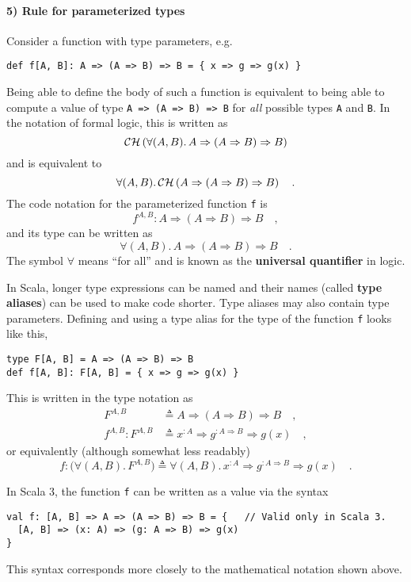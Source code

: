 \paragraph{5) Rule for parameterized types}

Consider a function with type parameters, e.g.
\begin{lstlisting}
def f[A, B]: A => (A => B) => B = { x => g => g(x) }
\end{lstlisting}
Being able to define the body of such a function is equivalent to
being able to compute a value of type \lstinline!A => (A => B) => B!
for \emph{all} possible types \lstinline!A! and \lstinline!B!. In
the notation of formal logic, this is written as
\[
{\cal CH}\left(\forall(A,B).\,A\Rightarrow(A\Rightarrow B)\Rightarrow B\right)
\]
and is equivalent to
\[
\forall(A,B).\,{\cal CH}\left(A\Rightarrow(A\Rightarrow B)\Rightarrow B\right)\quad.
\]
The code notation for the parameterized function \lstinline!f! is
\[
f^{A,B}:A\Rightarrow\left(A\Rightarrow B\right)\Rightarrow B\quad,
\]
and its type can be written as
\[
\forall(A,B).\,A\Rightarrow\left(A\Rightarrow B\right)\Rightarrow B\quad.
\]
The symbol $\forall$ means ``for all'' and is known as the \textbf{universal
quantifier} in logic.

In Scala, longer type expressions can be named and their names (called
\textbf{type aliases}) can be used to make code
shorter. Type aliases may also contain type parameters. Defining and
using a type alias for the type of the function \lstinline!f! looks
like this,
\begin{lstlisting}
type F[A, B] = A => (A => B) => B
def f[A, B]: F[A, B] = { x => g => g(x) }
\end{lstlisting}
This is written in the type notation as
\begin{align*}
F^{A,B} & \triangleq A\Rightarrow\left(A\Rightarrow B\right)\Rightarrow B\quad,\\
f^{A,B}:F^{A,B} & \triangleq x^{:A}\Rightarrow g^{:A\Rightarrow B}\Rightarrow g(x)\quad,
\end{align*}
or equivalently (although somewhat less readably)
\[
f:\big(\forall(A,B).\,F^{A,B}\big)\triangleq\forall(A,B).\,x^{:A}\Rightarrow g^{:A\Rightarrow B}\Rightarrow g(x)\quad.
\]

In Scala 3, the function \lstinline!f! can be written as a value
via the syntax
\begin{lstlisting}
val f: [A, B] => A => (A => B) => B = {   // Valid only in Scala 3.
  [A, B] => (x: A) => (g: A => B) => g(x)
}
\end{lstlisting}
This syntax corresponds more closely to the mathematical notation
shown above.

